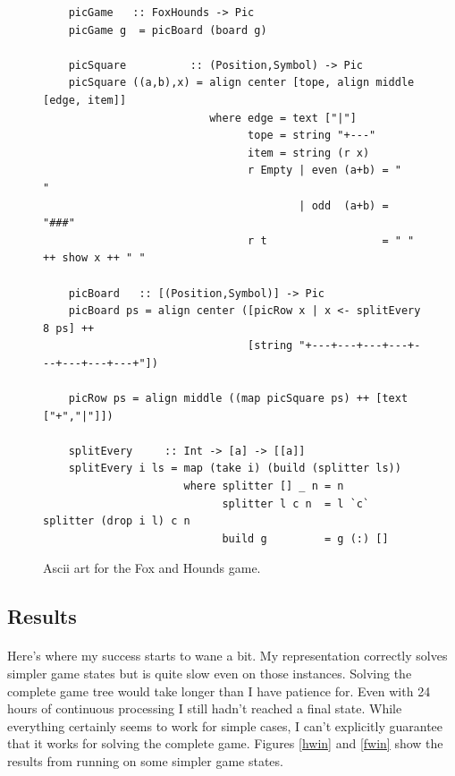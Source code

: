 \documentclass[10pt]{article}
\begin{document}
    \begin{figure}[ht]
        \centering
        \begin{verbatim}
    picGame   :: FoxHounds -> Pic
    picGame g  = picBoard (board g)

    picSquare          :: (Position,Symbol) -> Pic
    picSquare ((a,b),x) = align center [tope, align middle [edge, item]]
                          where edge = text ["|"]
                                tope = string "+---"
                                item = string (r x)
                                r Empty | even (a+b) = "   "
                                        | odd  (a+b) = "###"
                                r t                  = " " ++ show x ++ " "

    picBoard   :: [(Position,Symbol)] -> Pic
    picBoard ps = align center ([picRow x | x <- splitEvery 8 ps] ++ 
                                [string "+---+---+---+---+---+---+---+---+"])

    picRow ps = align middle ((map picSquare ps) ++ [text ["+","|"]])

    splitEvery     :: Int -> [a] -> [[a]]
    splitEvery i ls = map (take i) (build (splitter ls))
                      where splitter [] _ n = n
                            splitter l c n  = l `c` splitter (drop i l) c n
                            build g         = g (:) []    \end{verbatim}
        \caption{Ascii art for the Fox and Hounds game.} \label{hhascii}
    \end{figure}
 
\clearpage
\subsection{Results}
    \paragraph{} Here's where my success starts to wane a bit.  My representation 
    correctly solves simpler game states but is quite slow even on those instances.
    Solving the complete game tree would take longer than I have patience for.  
    Even with 24 hours of continuous processing I still hadn't reached a final state.
    While everything certainly seems to work for simple cases, I can't explicitly
    guarantee that it works for solving the complete game.  Figures \ref{hwin} and
    \ref{fwin} show the results from running on some simpler game states.
\end{document}
